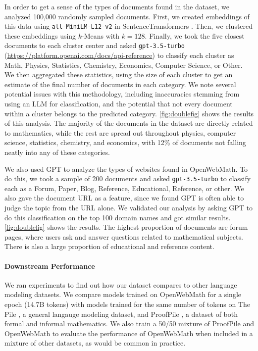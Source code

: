 In order to get a sense of the types of documents found in the dataset, we analyzed 100,000 randomly sampled documents. First, we created embeddings of this data using \texttt{all-MiniLM-L12-v2} \citep{wang2020minilm} in SentenceTransformers \citep{reimers-2019-sentence-bert}. Then, we clustered these embeddings using $k$-Means with $k=128$. Finally, we took the five closest documents to each cluster center and asked \texttt{gpt-3.5-turbo} (\href{https://platform.openai.com/docs/api-reference}{https://platform.openai.com/docs/api-reference}) to classify each cluster as Math, Physics, Statistics, Chemistry, Economics, Computer Science, or Other. We then aggregated these statistics, using the size of each cluster to get an estimate of the final number of documents in each category. We note several potential issues with this methodology, including inaccuracies stemming from using an LLM for classification, and the potential that not every document within a cluster belongs to the predicted category. \autoref{fig:doublefig} shows the results of this analysis. The majority of the documents in the dataset are directly related to mathematics, while the rest are spread out throughout physics, computer science, statistics, chemistry, and economics, with 12\% of documents not falling neatly into any of these categories.

We also used GPT to analyze the types of websites found in OpenWebMath. To do this, we took a sample of 200 documents and asked \texttt{gpt-3.5-turbo} to classify each as a Forum, Paper, Blog, Reference, Educational, Reference, or other. We also gave the document URL as a feature, since we found GPT is often able to judge the topic from the URL alone. We validated our analysis by asking GPT to do this classification on the top 100 domain names and got similar results. \autoref{fig:doublefig} shows the results. The highest proportion of documents are forum pages, where users ask and answer questions related to mathematical subjects. There is also a large proportion of educational and reference content.

\paragraph{Downstream Performance}
\label{sec:models}
We ran experiments to find out how our dataset compares to other language modeling datasets. We compare models trained on OpenWebMath for a single epoch (14.7B tokens) with models trained for the same number of tokens on The Pile \citep{gao2020pile}, a general langauge modeling dataset, and ProofPile \citep{azerbayev2023proofnet}, a dataset of both formal and informal mathematics. We also train a 50/50 mixture of ProofPile and OpenWebMath to evaluate the performance of OpenWebMath when included in a mixture of other datasets, as would be common in practice.

